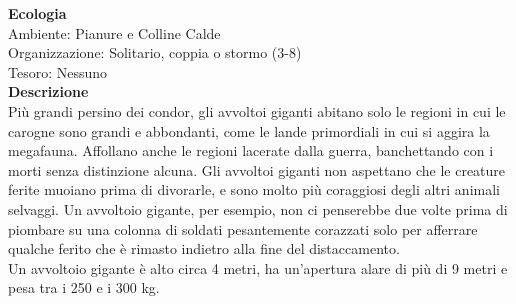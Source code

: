 \begin{multicols}{2}
\textbf{Ecologia}\\
Ambiente: Pianure e Colline Calde\\
Organizzazione: Solitario, coppia o stormo (3-8)\\
Tesoro: Nessuno\\
\textbf{Descrizione}\\
Più grandi persino dei condor, gli avvoltoi giganti abitano solo le regioni in cui le carogne sono grandi e abbondanti, come le lande primordiali in cui si aggira la megafauna. Affollano anche le regioni lacerate dalla guerra, banchettando con i morti senza distinzione alcuna. Gli avvoltoi giganti non aspettano che le creature ferite muoiano prima di divorarle, e sono molto più coraggiosi degli altri animali selvaggi. Un avvoltoio gigante, per esempio, non ci penserebbe due volte prima di piombare su una colonna di soldati pesantemente corazzati solo per afferrare qualche ferito che è rimasto indietro alla fine del distaccamento.\\
Un avvoltoio gigante è alto circa 4 metri, ha un'apertura alare di più di 9 metri e pesa tra i 250 e i 300 kg.\\



\end{multicols}
